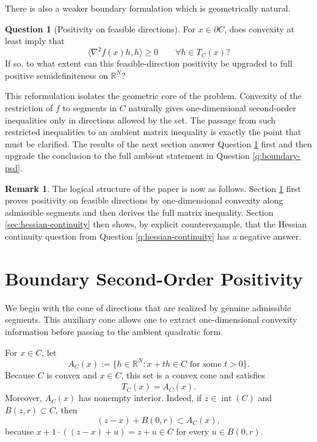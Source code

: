 \documentclass[reqno]{amsart}
\theoremstyle{definition}
\newtheorem{remark}[theorem]{Remark}
\newtheorem{question}{Question}
\newcommand{\R}{\mathbb{R}}
\newcommand{\inner}[2]{\langle #1,#2\rangle}
\begin{document}
There is also a weaker boundary formulation which is geometrically natural.

\begin{question}[Positivity on feasible directions]\label{q:feasible-directions}
For $x \in \partial C$, does convexity at least imply that
\begin{equation}
    \inner{\nabla^2 f(x)h}{h} \geq 0 \qquad \forall h \in T_C(x)?
\end{equation}
If so, to what extent can this feasible-direction positivity be upgraded to full
positive semidefiniteness on $\R^N$?
\end{question}

This reformulation isolates the geometric core of the problem. Convexity of the
restriction of $f$ to segments in $C$ naturally gives one-dimensional
second-order inequalities only in directions allowed by the set. The passage
from such restricted inequalities to an ambient matrix inequality is exactly the
point that must be clarified. The results of the next section answer Question
\ref{q:feasible-directions} first and then upgrade the conclusion to the full
ambient statement in Question \ref{q:boundary-psd}.

\begin{remark}\label{rem:roadmap}
The logical structure of the paper is now as follows. Section
\ref{sec:boundary-positivity} first proves positivity on feasible directions by
one-dimensional convexity along admissible segments and then derives the full
matrix inequality. Section \ref{sec:hessian-continuity} then shows, by explicit
counterexample, that the Hessian continuity question from Question
\ref{q:hessian-continuity} has a negative answer.
\end{remark}

\section{Boundary Second-Order Positivity}\label{sec:boundary-positivity}

We begin with the cone of directions that are realized by genuine admissible
segments. This auxiliary cone allows one to extract one-dimensional convexity
information before passing to the ambient quadratic form.

For $x \in C$, let
\begin{equation}
    A_C(x):=\{h \in \R^N : x+t h \in C \text{ for some } t>0\}.
\end{equation}
Because $C$ is convex and $x \in C$, this set is a convex cone and satisfies
\begin{equation}
    T_C(x)=\overline{A_C(x)}.
\end{equation}
Moreover, $A_C(x)$ has nonempty interior. Indeed, if $z \in \operatorname{int}(C)$
and $B(z,r) \subset C$, then
\begin{equation}
    (z-x)+B(0,r) \subset A_C(x),
\end{equation}
because $x+1\cdot ((z-x)+u)=z+u \in C$ for every $u \in B(0,r)$.
\end{document}
